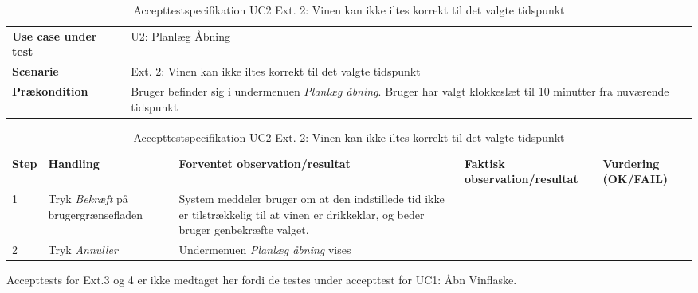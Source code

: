 \begin{table}[H]
	\centering
	\caption{Accepttestspecifikation UC2 Ext. 2: Vinen kan ikke iltes korrekt til det valgte tidspunkt}
	\label{ATUC2:Ext2}
	\begin{tabular}{ p{80pt}  p{320pt} }\hline
		\rowcolor{lightgray}	
		\textbf{Use case under test} & U2: Planlæg Åbning \\
		\rowcolor{white}
		\textbf{Scenarie} & Ext. 2: Vinen kan ikke iltes korrekt til det valgte tidspunkt \\\rowcolor{lightgray}	
		\textbf{Prækondition} &
		Bruger befinder sig i undermenuen \emph{Planlæg åbning}. Bruger har valgt klokkeslæt til 10 minutter fra nuværende tidspunkt \\
		\hline
	\end{tabular}
	\begin{tabular}{  p{26pt} p{100pt}  p{101pt} | p{67pt} | p{68pt}}
		\textbf{Step} & \textbf{Handling} & \textbf{Forventet observation/resultat} & \textbf{Faktisk observation/resultat} & \textbf{Vurdering (OK/FAIL)}\\
		1 & Tryk \emph{Bekræft} på brugergrænsefladen & System meddeler bruger om at den indstillede tid ikke er tilstrækkelig til at vinen er drikkeklar, og beder bruger genbekræfte valget.
 &  &  \\
 		2 & Tryk \emph{Annuller} & Undermenuen \emph{Planlæg åbning} vises\\
		\hline
	\end{tabular}
\end{table}

Accepttests for Ext.3 og 4 er ikke medtaget her fordi de testes under accepttest for UC1: Åbn Vinflaske.

